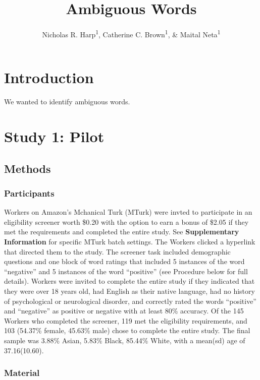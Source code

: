\documentclass[man]{apa6}
\title{Ambiguous Words}
\author{Nicholas R. Harp\textsuperscript{1}, Catherine C. Brown\textsuperscript{1}, \& Maital Neta\textsuperscript{1}}
\date{}
\affiliation{
\vspace{0.5cm}
\textsuperscript{1} University of Nebraska-Lincoln}
\begin{document}
\maketitle

\hypertarget{introduction}{%
\section{Introduction}\label{introduction}}

We wanted to identify ambiguous words.

\hypertarget{study-1-pilot}{%
\section{Study 1: Pilot}\label{study-1-pilot}}

\hypertarget{methods}{%
\subsection{Methods}\label{methods}}

\hypertarget{participants}{%
\subsubsection{Participants}\label{participants}}

Workers on Amazon's Mchanical Turk (MTurk) were invted to participate in an eligibility screener worth \$0.20 with the option to earn a bonus of \$2.05 if they met the requirements and completed the entire study. See \textbf{Supplementary Information} for specific MTurk batch settings. The Workers clicked a hyperlink that directed them to the study. The screener task included demographic questions and one block of word ratings that included 5 instances of the word \enquote{negative} and 5 instances of the word \enquote{positive} (see Procedure below for full details). Workers were invited to complete the entire study if they indicated that they were over 18 years old, had English as their native language, had no history of psychological or neurological disorder, and correctly rated the words \enquote{positive} and \enquote{negative} as positive or negative with at least 80\% accuracy. Of the 145 Workers who completed the screener, 119 met the eligibility requirements, and 103 (54.37\% female, 45.63\% male) chose to complete the entire study. The final sample was 3.88\% Asian, 5.83\% Black, 85.44\% White, with a mean(sd) age of 37.16(10.60).

\hypertarget{material}{%
\subsubsection{Material}\label{material}}
\end{document}
